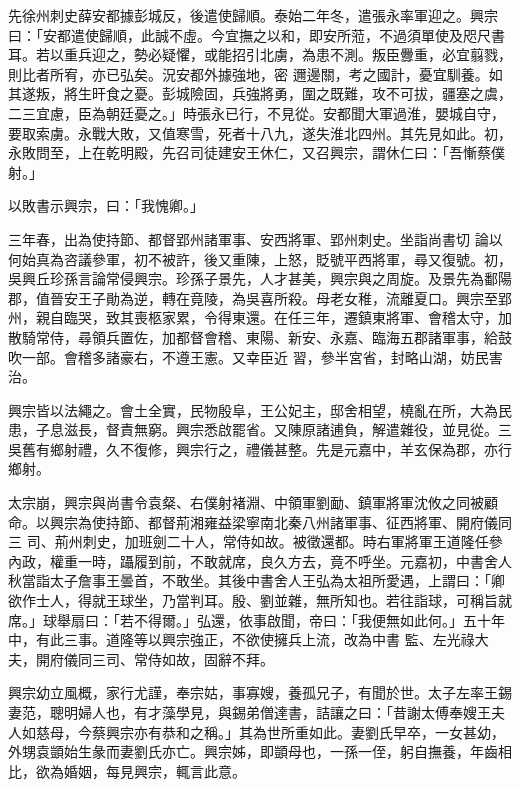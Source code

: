 \begin{pinyinscope}
 先徐州刺史薛安都據彭城反，後遣使歸順。泰始二年冬，遣張永率軍迎之。興宗曰：「安都遣使歸順，此誠不虛。今宜撫之以和，即安所蒞，不過須單使及咫尺書耳。若以重兵迎之，勢必疑懼，或能招引北虜，為患不測。叛臣釁重，必宜翦戮，則比者所宥，亦已弘矣。況安都外據強地，密
 邇邊關，考之國計，憂宜馴養。如其遂叛，將生旰食之憂。彭城險固，兵強將勇，圍之既難，攻不可拔，疆塞之虞，二三宜慮，臣為朝廷憂之。」時張永已行，不見從。安都聞大軍過淮，嬰城自守，要取索虜。永戰大敗，又值寒雪，死者十八九，遂失淮北四州。其先見如此。初，永敗問至，上在乾明殿，先召司徒建安王休仁，又召興宗，謂休仁曰：「吾慚蔡僕射。」



 以敗書示興宗，曰：「我愧卿。」



 三年春，出為使持節、都督郢州諸軍事、安西將軍、郢州刺史。坐詣尚書切
 論以何始真為咨議參軍，初不被許，後又重陳，上怒，貶號平西將軍，尋又復號。初，吳興丘珍孫言論常侵興宗。珍孫子景先，人才甚美，興宗與之周旋。及景先為鄱陽郡，值晉安王子勛為逆，轉在竟陵，為吳喜所殺。母老女稚，流離夏口。興宗至郢州，親自臨哭，致其喪柩家累，令得東還。在任三年，遷鎮東將軍、會稽太守，加散騎常侍，尋領兵置佐，加都督會稽、東陽、新安、永嘉、臨海五郡諸軍事，給鼓吹一部。會稽多諸豪右，不遵王憲。又幸臣近
 習，參半宮省，封略山湖，妨民害治。



 興宗皆以法繩之。會土全實，民物殷阜，王公妃主，邸舍相望，橈亂在所，大為民患，子息滋長，督責無窮。興宗悉啟罷省。又陳原諸逋負，解遣雜役，並見從。三吳舊有鄉射禮，久不復修，興宗行之，禮儀甚整。先是元嘉中，羊玄保為郡，亦行鄉射。



 太宗崩，興宗與尚書令袁粲、右僕射褚淵、中領軍劉勔、鎮軍將軍沈攸之同被顧命。以興宗為使持節、都督荊湘雍益梁寧南北秦八州諸軍事、征西將軍、開府儀同三
 司、荊州刺史，加班劍二十人，常侍如故。被徵還都。時右軍將軍王道隆任參內政，權重一時，躡履到前，不敢就席，良久方去，竟不呼坐。元嘉初，中書舍人秋當詣太子詹事王曇首，不敢坐。其後中書舍人王弘為太祖所愛遇，上謂曰：「卿欲作士人，得就王球坐，乃當判耳。殷、劉並雜，無所知也。若往詣球，可稱旨就席。」球舉扇曰：「若不得爾。」弘還，依事啟聞，帝曰：「我便無如此何。」五十年中，有此三事。道隆等以興宗強正，不欲使擁兵上流，改為中書
 監、左光祿大夫，開府儀同三司、常侍如故，固辭不拜。



 興宗幼立風概，家行尤謹，奉宗姑，事寡嫂，養孤兄子，有聞於世。太子左率王錫妻范，聰明婦人也，有才藻學見，與錫弟僧達書，詰讓之曰：「昔謝太傅奉嫂王夫人如慈母，今蔡興宗亦有恭和之稱。」其為世所重如此。妻劉氏早卒，一女甚幼，外甥袁顗始生彖而妻劉氏亦亡。興宗姊，即顗母也，一孫一侄，躬自撫養，年齒相比，欲為婚姻，每見興宗，輒言此意。




\end{pinyinscope}
